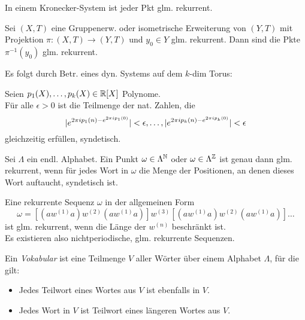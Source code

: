 \documentclass{cheat-sheet}
\begin{document}
\begin{thm}
  In einem Kronecker-System ist jeder Pkt glm. rekurrent.
\end{thm}

\begin{thm}
  Sei $(X, T)$ eine Gruppenerw. oder isometrische Erweiterung von $(Y, T)$ mit Projektion $\pi : (X, T) \to (Y, T)$ und $y_0 \in Y$ glm. rekurrent.
  Dann sind die Pkte $\pi^{-1}(y_0)$ glm. rekurrent.
\end{thm}

\begin{bem}
  Es folgt durch Betr. eines dyn. Systems auf dem $k$-dim Torus:
\end{bem}

\begin{thm}
  Seien $p_1(X), \ldots, p_k(X) \in \mathbb{R}[X]$ Polynome. \\
  Für alle $\epsilon > 0$ ist die Teilmenge der nat. Zahlen, die
  \[
    \lvert e^{2 \pi i p_1(n) - e^{2 \pi i p_1(0)}}\rvert < \epsilon, \ldots,
    \lvert e^{2 \pi i p_k(n) - e^{2 \pi i p_k(0)}}\rvert < \epsilon
  \]
  gleichzeitig erfüllen, syndetisch.
\end{thm}


\begin{prop}
  Sei $\Lambda$ ein endl. Alphabet. Ein Punkt $\omega \in \Lambda^{\mathbb{N}}$ oder $\omega \in \Lambda^{\mathbb{Z}}$ ist genau dann glm. rekurrent, wenn für jedes Wort in $\omega$ die Menge der Positionen, an denen dieses Wort auftaucht, syndetisch ist.
\end{prop}

\begin{bem}
  Eine rekurrente Sequenz $\omega$ in der allgemeinen Form
  \[ \omega = [(aw^{(1)}a)w^{(2)}(aw^{(1)}a)]w^{(3)}[(aw^{(1)}a)w^{(2)}(aw^{(1)}a)]\ldots \]
  ist glm. rekurrent, wenn die Länge der $w^{(n)}$ beschränkt ist. \\
  Es existieren also nichtperiodische, glm. rekurrente Sequenzen.
\end{bem}

\begin{defn}
  Ein \emph{Vokabular} ist eine Teilmenge $V$ aller Wörter über einem Alphabet $\Lambda$, für die gilt:
  \begin{itemize}
    \item Jedes Teilwort eines Wortes aus $V$ ist ebenfalls in $V$.
    \item Jedes Wort in $V$ ist Teilwort eines längeren Wortes aus $V$.
  \end{itemize}
\end{defn}
\end{document}
